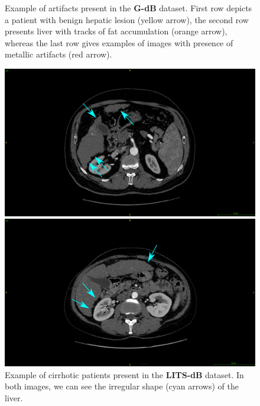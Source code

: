 \documentclass[]{article}
\newcommand{\lmttfont}[1]{{\fontfamily{lmtt}\selectfont #1}}
\begin{document}
\begin{figure}[!ht]
\begin{minipage}{0.45\linewidth}
	\end{minipage}
	\caption{Example of artifacts present in the \textbf{\lmttfont{G-dB}} dataset. First row depicts a patient with benign hepatic lesion (yellow arrow), the second row presents liver with tracks of fat accumulation (orange arrow), whereas the last row gives examples of images with presence of metallic artifacts (red arrow).}
	\label{fig:GDb_artifacts}
\end{figure}
\begin{figure}[!ht]
	\centering
	\begin{minipage}{0.45\linewidth}
		\includegraphics[width=\linewidth]{../Contributions/images/ResizeGDB_cirrhoticPatientArrows}
	\end{minipage} \hspace{-0.1cm}
	\begin{minipage}{0.45\linewidth}
		\includegraphics[width=\linewidth]{../Contributions/images/ResizeGDB_cirrhoticPatientArrows_2}
	\end{minipage}
	\caption{Example of cirrhotic patients present in the \textbf{\lmttfont{LITS-dB}} dataset. In both images, we can see the irregular shape (cyan arrows) of the liver.}
	\label{fig:GDb_diseasedLivers}
\end{figure}
\end{document}
